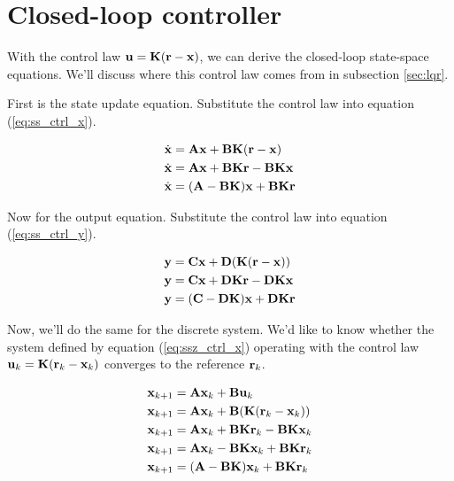\section{Closed-loop controller}

With the \gls{control law} $\mathbf{u} = \mathbf{K}(\mathbf{r} - \mathbf{x})$, we can derive
the closed-loop state-space equations. We'll discuss where this
\gls{control law} comes from in subsection \ref{sec:lqr}.

First is the \gls{state} update equation. Substitute the \gls{control law} into
equation (\ref{eq:ss_ctrl_x}).

\begin{align}
  \dot{\mathbf{x}} &= \mathbf{A}\mathbf{x} + \mathbf{B}\mathbf{K}(\mathbf{r} - \mathbf{x}) \nonumber
    \\
  \dot{\mathbf{x}} &= \mathbf{A}\mathbf{x} + \mathbf{B}\mathbf{K}\mathbf{r} -
    \mathbf{B}\mathbf{K}\mathbf{x} \nonumber \\
  \dot{\mathbf{x}} &= (\mathbf{A} - \mathbf{B}\mathbf{K})\mathbf{x} + \mathbf{B}\mathbf{K}\mathbf{r}
\end{align}

Now for the \gls{output} equation. Substitute the \gls{control law} into
equation (\ref{eq:ss_ctrl_y}).

\begin{align}
  \mathbf{y} &= \mathbf{C}\mathbf{x} + \mathbf{D}(\mathbf{K}(\mathbf{r} - \mathbf{x})) \nonumber \\
  \mathbf{y} &= \mathbf{C}\mathbf{x} + \mathbf{D}\mathbf{K}\mathbf{r} - \mathbf{D}\mathbf{K}\mathbf{x}
    \nonumber \\
  \mathbf{y} &= (\mathbf{C} - \mathbf{D}\mathbf{K})\mathbf{x} + \mathbf{D}\mathbf{K}\mathbf{r}
\end{align}

Now, we'll do the same for the discrete \gls{system}. We'd like to know whether
the \gls{system} defined by equation (\ref{eq:ssz_ctrl_x}) operating with the
\gls{control law} $\mathbf{u}_k = \mathbf{K}(\mathbf{r}_k - \mathbf{x}_k)$ converges to the
\gls{reference} $\mathbf{r}_k$.

\begin{align*}
  \mathbf{x}_{k+1} &= \mathbf{A}\mathbf{x}_k + \mathbf{B}\mathbf{u}_k \\
  \mathbf{x}_{k+1} &= \mathbf{A}\mathbf{x}_k + \mathbf{B}(\mathbf{K}(\mathbf{r}_k - \mathbf{x}_k)) \\
  \mathbf{x}_{k+1} &= \mathbf{A}\mathbf{x}_k + \mathbf{B}\mathbf{K}\mathbf{r}_k -
    \mathbf{B}\mathbf{K}\mathbf{x}_k \\
  \mathbf{x}_{k+1} &= \mathbf{A}\mathbf{x}_k - \mathbf{B}\mathbf{K}\mathbf{x}_k +
    \mathbf{B}\mathbf{K}\mathbf{r}_k \\
  \mathbf{x}_{k+1} &= (\mathbf{A} - \mathbf{B}\mathbf{K})\mathbf{x}_k + \mathbf{B}\mathbf{K}\mathbf{r}_k
\end{align*}

